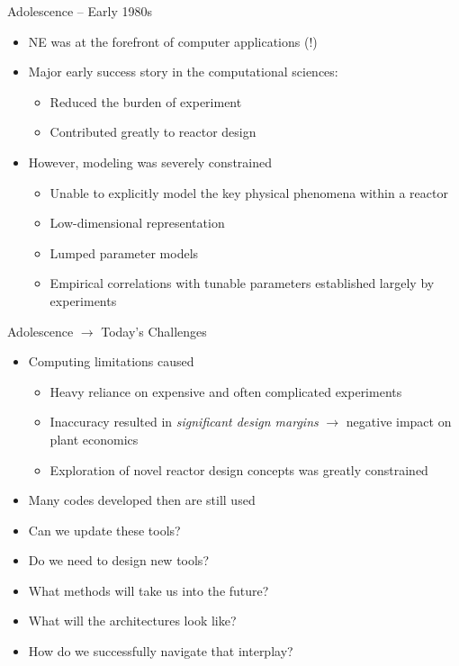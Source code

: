 \documentclass[xcolor=x11names,compress]{beamer}
\renewcommand{\(}{\begin{columns}}
\renewcommand{\)}{\end{columns}}
\newcommand{\<}[1]{\begin{column}{#1}}
\renewcommand{\>}{\end{column}}
\begin{document}
\begin{frame}{Adolescence -- Early 1980s}
\begin{itemize}
\item NE was at the forefront of computer applications (!)
\item Major early success story in the computational sciences:
\begin{itemize}
\item Reduced the burden of experiment
\item Contributed greatly to reactor design
\end{itemize}
\item However, modeling was severely constrained 
\begin{itemize}
\item Unable to explicitly model the key physical phenomena within a reactor
\item Low-dimensional representation
\item Lumped parameter models
\item Empirical correlations with tunable parameters established largely by experiments
\end{itemize}
\end{itemize}
\end{frame}

\begin{frame}{Adolescence $\rightarrow$ Today's Challenges}
\begin{itemize}
\item Computing limitations caused
\begin{itemize}
\item Heavy reliance on expensive and often complicated experiments
\item Inaccuracy resulted in \emph{significant design margins} $\rightarrow$ negative impact on plant economics
\item Exploration of novel reactor design concepts was greatly constrained 
\end{itemize}
\item Many codes developed then are still used 
\item Can we update these tools?
\item Do we need to design new tools?
\item What methods will take us into the future?
\item What will the architectures look like?
\item How do we successfully navigate that interplay?
\end{itemize}
\end{frame}
\end{document}
